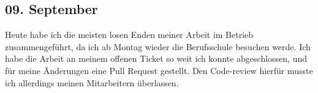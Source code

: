 \subsection{09. September}
Heute habe ich die meisten losen Enden meiner Arbeit im Betrieb zusammengeführt, da ich ab Montag wieder die Berufsschule besuchen werde. Ich habe die Arbeit an meinem offenen Ticket so weit ich konnte abgeschlossen, und für meine Änderungen eine Pull Request gestellt. Den Code-review hierfür musste ich allerdings meinen Mitarbeitern überlassen.